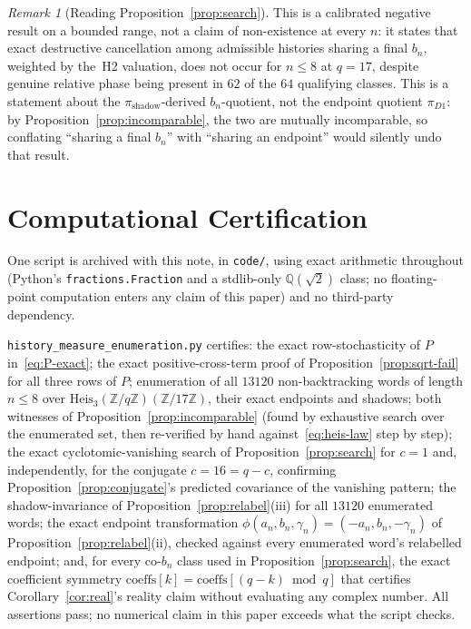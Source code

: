 \documentclass[11pt,a4paper]{article}
\theoremstyle{definition}
\theoremstyle{remark}
\newtheorem{remark}[theorem]{Remark}
\newcommand{\Z}{\mathbb{Z}}
\newcommand{\Q}{\mathbb{Q}}
\newcommand{\Qroot}{\Q(\sqrt{2})}
\newcommand{\Heis}{\mathrm{Heis}_3(\Z/q\Z)}
\begin{document}
\begin{remark}[Reading Proposition~\ref{prop:search}]
  \label{rem:search-reading}
  This is a calibrated negative result on a bounded range, not a claim of non-existence
  at every $n$: it states that exact destructive cancellation among admissible
  histories sharing a final $b_n$, weighted by the~\textup{H2} valuation, does not occur
  for $n\le8$ at $q=17$, despite genuine relative phase being present in $62$ of the
  $64$ qualifying classes. This is a statement about the $\pi_{\mathrm{shadow}}$-derived
  $b_n$-quotient, not the endpoint quotient $\pi_{D1}$: by
  Proposition~\ref{prop:incomparable}, the two are mutually incomparable, so conflating
  ``sharing a final $b_n$'' with ``sharing an endpoint'' would silently undo that result.
\end{remark}

\section{Computational Certification}
\label{sec:certification}

One script is archived with this note, in \texttt{code/}, using exact arithmetic
throughout (Python's \texttt{fractions.Fraction} and a stdlib-only $\Qroot$ class; no
floating-point computation enters any claim of this paper) and no third-party
dependency.

\texttt{history\_measure\_enumeration.py} certifies: the exact row-stochasticity of $P$
in~\eqref{eq:P-exact}; the exact positive-cross-term proof of
Proposition~\ref{prop:sqrt-fail} for all three rows of $P$; enumeration of all $13120$
non-backtracking words of length $n \le 8$ over $\Heis(\Z/17\Z)$, their exact endpoints
and shadows; both witnesses of Proposition~\ref{prop:incomparable} (found by exhaustive
search over the enumerated set, then re-verified by hand against~\eqref{eq:heis-law}
step by step); the exact cyclotomic-vanishing search of Proposition~\ref{prop:search}
for $c=1$ and, independently, for the conjugate $c=16=q-c$, confirming
Proposition~\ref{prop:conjugate}'s predicted covariance of the vanishing pattern; the
shadow-invariance of Proposition~\ref{prop:relabel}(iii) for all $13120$ enumerated
words; the exact endpoint transformation $\phi(a_n,b_n,\gamma_n)=(-a_n,b_n,-\gamma_n)$
of Proposition~\ref{prop:relabel}(ii), checked against every enumerated word's
relabelled endpoint; and, for every co-$b_n$ class used in
Proposition~\ref{prop:search}, the exact coefficient symmetry
$\mathrm{coeffs}[k]=\mathrm{coeffs}[(q{-}k)\bmod q]$ that certifies
Corollary~\ref{cor:real}'s reality claim without evaluating any complex number. All
assertions pass; no numerical claim in this paper exceeds what the script checks.
\end{document}
